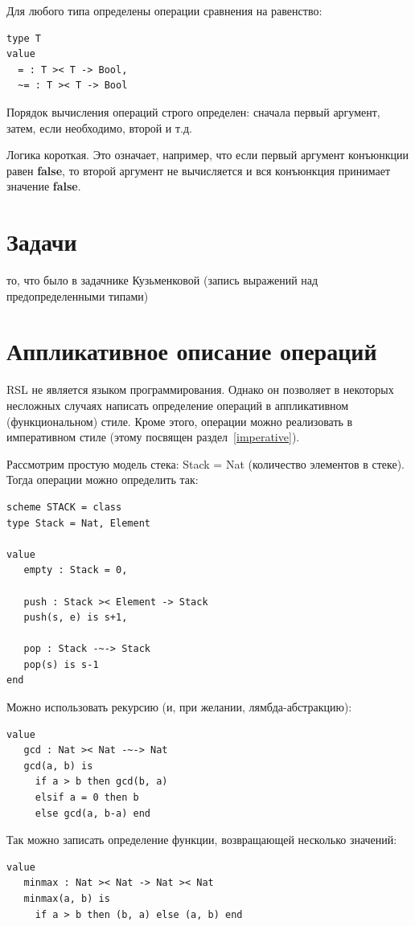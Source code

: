 \documentclass[14pt, twoside]{extreport}
\begin{document}
Для любого типа определены операции сравнения на равенство:
\begin{lstlisting}
type T
value
  = : T >< T -> Bool,
  ~= : T >< T -> Bool
\end{lstlisting}

Порядок вычисления операций строго определен: сначала первый аргумент, затем, если необходимо, второй и т.д.

Логика короткая. Это означает, например, что если первый аргумент конъюнкции равен \textbf{false}, то второй аргумент не вычисляется и вся конъюнкция принимает значение \textbf{false}.

\section*{Задачи}

то, что было в задачнике Кузьменковой (запись выражений над предопределенными типами)

\section{Аппликативное описание операций}

RSL не является языком программирования. Однако он позволяет в некоторых несложных случаях написать определение операций в аппликативном (функциональном) стиле. Кроме этого, операции можно реализовать в императивном стиле (этому посвящен раздел~\ref{imperative}).

Рассмотрим простую модель стека: Stack = Nat (количество элементов в стеке). Тогда операции можно определить так:
\begin{lstlisting}
scheme STACK = class
type Stack = Nat, Element

value
   empty : Stack = 0,
	
   push : Stack >< Element -> Stack
   push(s, e) is s+1,
	
   pop : Stack -~-> Stack
   pop(s) is s-1
end
\end{lstlisting}

Можно использовать рекурсию (и, при желании, лямбда-абстракцию):
\begin{lstlisting}
value
   gcd : Nat >< Nat -~-> Nat
   gcd(a, b) is
     if a > b then gcd(b, a)
     elsif a = 0 then b
     else gcd(a, b-a) end
\end{lstlisting}

Так можно записать определение функции, возвращающей несколько значений:
\begin{lstlisting}
value
   minmax : Nat >< Nat -> Nat >< Nat
   minmax(a, b) is
     if a > b then (b, a) else (a, b) end
\end{lstlisting}
\end{document}
